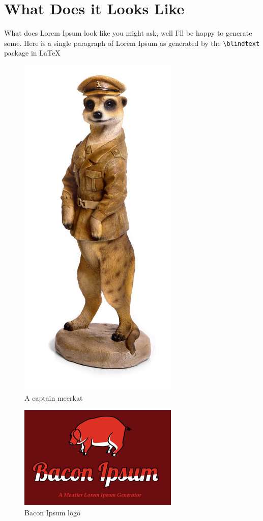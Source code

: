 \documentclass[11pt]{article}
\begin{document}
\section{What Does it Looks Like}
What does Lorem Ipsum look like you might ask, well I'll be happy to generate some.
Here is a single paragraph of Lorem Ipsum as generated by the \verb=\blindtext= package in \LaTeX\ \\
\indent
\blindtext
\begin{figure}[ht]
\begin{center}
\includegraphics[width=3in, scale=0.5]{captainmeerkat.jpeg}
\end{center}
\caption{A captain meerkat~\cite{meerkat}}
\label{fig:meerkat}
\end{figure}

\begin{figure}
\begin{center}
\includegraphics[width=3in, scale=0.5]{bacon_ipsum.png}
\end{center}
\caption{Bacon Ipsum logo~\cite{bacon}}
\label{fig:bacon}
\end{figure}
\end{document}
